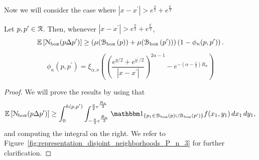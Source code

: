 Now we will consider the case where $|x - x^\prime| > e^{\frac{y}{2}} + e^{\frac{y^\prime}{2}}$

\begin{lemma}\label{lem:disjoint_neighbors_P_n_large}
Let $p, p^\prime \in {\mathcal R}$. Then, whenever $|x - x^\prime| > e^{\frac{y}{2}} + e^{\frac{y^\prime}{2}}$,
\[
	\mathbb{E}\left[{\mathcal N}_{\text{box}}(p\Delta p^\prime)\right]
	\ge \left(\mu({\mathcal B}_{\text{box}}\left(p\right)) + \mu({\mathcal B}_{\text{box}}\left(p^\prime\right))\right)
		\left(1-\phi_n(p,p^\prime)\right).
\]

\[
	\phi_n(p,p^\prime) = \xi_{\alpha, \nu}\left( \left(\frac{e^{y/2} + e^{y^\prime/2}}{|x-x^\prime|}\right)^{2\alpha - 1}
	- e^{-(\alpha - \frac{1}{2})R_n}\right)
\]
\end{lemma}

\begin{proof}
We will prove the results by using that
\[
	\Exp{\Ncal_{\text{box}}(p\Delta p^\prime)} 
	\ge \int_0^{h(p,p^\prime)} \int_{-\frac{\pi}{2}e^{\frac{R_n}{2}}}^{\frac{\pi}{2}e^{\frac{R_n}{2}}} \ind{p_1 \in \BallPon{p} \cup \BallPon{p^\prime}} f(x_1,y_1) \, dx_1 \, dy_1,
\]
and computing the integral on the right. We refer to Figure~\ref{fig:representation_disjoint_neighborhoods_P_n_3} for further clarification. 


\end{proof}
